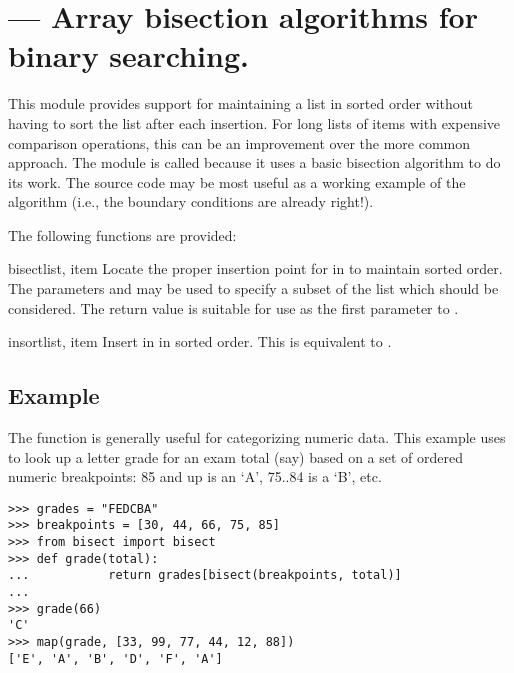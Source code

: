 
\section{ ---
         Array bisection algorithms for binary searching.}




This module provides support for maintaining a list in sorted order
without having to sort the list after each insertion.  For long lists
of items with expensive comparison operations, this can be an
improvement over the more common approach.  The module is called
 because it uses a basic bisection algorithm to do its
work.  The source code may be most useful as a working example of the
algorithm (i.e., the boundary conditions are already right!).

The following functions are provided:

\begin{funcdesc}{bisect}{list, item}
Locate the proper insertion point for  in  to
maintain sorted order.  The parameters  and  may be
used to specify a subset of the list which should be considered.  The
return value is suitable for use as the first parameter to
.
\end{funcdesc}

\begin{funcdesc}{insort}{list, item}
Insert  in  in sorted order.  This is equivalent
to .
\end{funcdesc}


\subsection{Example}

The  function is generally useful for categorizing
numeric data.  This example uses  to look up a
letter grade for an exam total (say) based on a set of ordered numeric
breakpoints: 85 and up is an `A', 75..84 is a `B', etc.

\begin{verbatim}
>>> grades = "FEDCBA"
>>> breakpoints = [30, 44, 66, 75, 85]
>>> from bisect import bisect
>>> def grade(total):
...           return grades[bisect(breakpoints, total)]
...
>>> grade(66)
'C'
>>> map(grade, [33, 99, 77, 44, 12, 88])
['E', 'A', 'B', 'D', 'F', 'A']
\end{verbatim}
